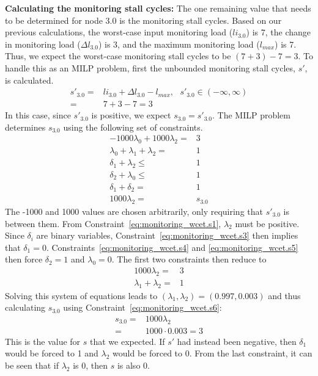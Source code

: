 {\bf Calculating the monitoring stall cycles:} The one remaining value that
needs to be determined for node 3.0 is the monitoring stall cycles. Based on
our previous calculations, the worst-case input monitoring load ($li_{3.0}$) is
7, the change in monitoring load ($\Delta l_{3.0}$) is 3, and the maximum
monitoring load ($l_{max}$) is 7. Thus, we expect the worst-case monitoring
stall cycles to be $(7+3)-7 = 3$. To handle this as an MILP problem, first the
unbounded monitoring stall cycles, $s'$, is calculated.
\begin{align*}
  s'_{3.0} =& li_{3.0} + \Delta l_{3.0} - l_{max}, \text{ } s'_{3.0} \in (-\infty, \infty) \\
  =& 7 + 3 - 7 = 3
\end{align*}
In this case, since $s'_{3.0}$ is positive, we expect $s_{3.0} = s'_{3.0}$. The
MILP problem determines $s_{3.0}$ using the following set of constraints.
\begin{subequations}
\begin{align}
  -1000\lambda_0 + 1000\lambda_2 =& 3 \label{eq:monitoring_wcet.s1}\\
  \lambda_0 + \lambda_1 + \lambda_2 =& 1 \label{eq:monitoring_wcet.s2}\\
  \delta_1 + \lambda_2 \leq& 1 \label{eq:monitoring_wcet.s3}\\
  \delta_2 + \lambda_0 \leq& 1 \label{eq:monitoring_wcet.s4}\\
  \delta_1 + \delta_2 =& 1 \label{eq:monitoring_wcet.s5}\\
  1000\lambda_2 =& s_{3.0} \label{eq:monitoring_wcet.s6}
\end{align}
\end{subequations}
The -1000 and 1000 values are chosen arbitrarily, only requiring that
$s'_{3.0}$ is between them. From Constraint~\ref{eq:monitoring_wcet.s1},
$\lambda_2$ must be positive. Since $\delta_i$ are binary variables,
Constraint~\ref{eq:monitoring_wcet.s3} then implies that $\delta_1 = 0$.
Constraints~\ref{eq:monitoring_wcet.s4} and \ref{eq:monitoring_wcet.s5} then
force $\delta_2 = 1$ and $\lambda_0 = 0$. The first two constraints then reduce
to
\begin{align*}
  1000\lambda_2 =& 3\\
  \lambda_1 + \lambda_2 =& 1 
\end{align*}
Solving this system of equations leads to $(\lambda_1, \lambda_2) = (0.997,
0.003)$ and thus calculating $s_{3.0}$ using
Constraint~\ref{eq:monitoring_wcet.s6}:
\begin{align*}
  s_{3.0} =& 1000 \lambda_2 \\
  =& 1000 \cdot 0.003 = 3
\end{align*}
This is the value for $s$ that we expected. If $s'$ had instead been negative,
then $\delta_1$ would be forced to 1 and $\lambda_2$ would be forced to 0. From
the last constraint, it can be seen that if $\lambda_2$ is 0, then $s$ is also
0.

